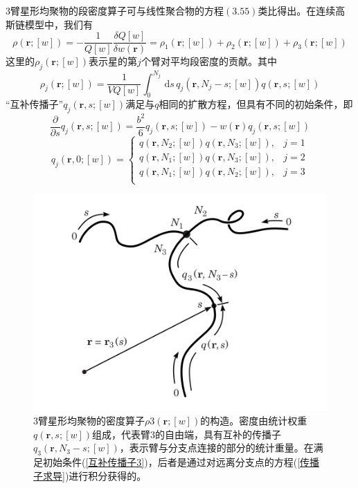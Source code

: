 $3$臂星形均聚物的段密度算子可与线性聚合物的方程$(3.55)$类比得出。在连续高斯链模型中，我们有
\begin{equation}
\rho(\mathbf{r};[w])=-\frac{1}{Q[w]}\frac{\delta Q[w]}{\delta w(\mathbf{r})}=\rho _1(\mathbf{r};[w])+\rho _2(\mathbf{r};[w])+\rho _3(\mathbf{r};[w])
\end{equation}
这里的$\rho _j(\mathbf{r};[w])$表示星的第$j$个臂对平均段密度的贡献。其中
\begin{equation}
\rho _{j}(\mathbf{r};[w])=\frac{1}{VQ[w]} \int_{0}^{N_j}\, \mathrm{d}s\,q_{j}(\mathbf{r},N_{j}-s;[w])q(\mathbf{r},s;[w]) \label{87}
\end{equation}
“互补传播子”$q_{j}(\mathbf{r},s;[w])$满足与$q$相同的扩散方程，但具有不同的初始条件，即
\begin{equation}
\frac{\partial}{\partial s}q_j(\mathbf{r},s;[w])=\frac{b^2}{6}q_j(\mathbf{r},s;[w])-w(\mathbf{r})q_j(\mathbf{r},s;[w]) \label{传播子求导}
\end{equation}
\begin{equation}
q_j(\mathbf{r},0;[w])=
\begin{cases}
q(\mathbf{r},N_2;[w])q(\mathbf{r},N_3;[w]), & j=1 \\
q(\mathbf{r},N_1;[w])q(\mathbf{r},N_3;[w]), & j=2 \\
q(\mathbf{r},N_1;[w])q(\mathbf{r},N_2;[w]), & j=3 \\ \label{互补传播子3}
\end{cases}
\end{equation}

\begin{figure}[H]
\centering
\includegraphics[scale=0.7]{./figures/35.png}
\caption{$3$臂星形均聚物的密度算子$\rho 3(\mathbf{r};[w])$的构造。密度由统计权重$q(\mathbf{r},s;[w])$组成，代表臂$3$的自由端，具有互补的传播子$q_3(\mathbf{r},N_3-s;[w])$，表示臂与分支点连接的部分的统计重量。在满足初始条件(\ref{互补传播子3})，后者是通过对远离分支点的方程(\ref{传播子求导})进行积分获得的。}
\label{三臂星形图像}
\end{figure}

